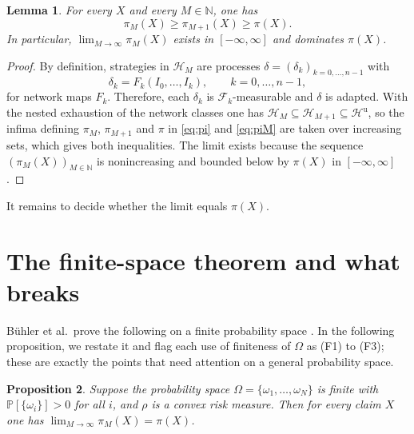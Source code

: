 \documentclass[11pt,a4paper]{report}
\numberwithin{equation}{chapter}
\theoremstyle{plain}
\newtheorem{proposition}{Proposition}[chapter]
\newtheorem{lemma}[proposition]{Lemma}
\theoremstyle{definition}
\newcommand{\PP}{\mathbb{P}}
\newcommand{\N}{\mathbb{N}}
\newcommand{\F}{\mathcal{F}}
\newcommand{\HH}{\mathcal{H}}
\newcommand{\Hu}{\mathcal{H}^{\mathrm{u}}}
\begin{document}
\begin{lemma}\label{lem:monotone}
  For every $X$ and every $M\in\N$, one has
  \[
    \pi_M(X)\ge\pi_{M+1}(X)\ge\pi(X).
  \]
  In particular, $\lim_{M\to\infty}\pi_M(X)$ exists in
  $[-\infty,\infty]$ and dominates $\pi(X)$.
\end{lemma}

\begin{proof}
  By definition, strategies in $\HH_M$ are processes
  $\delta=(\delta_k)_{k=0,\dots,n-1}$ with
  \[
    \delta_k=F_k(I_0,\dots,I_k),\qquad k=0,\dots,n-1,
  \]
  for network maps $F_k$.  Therefore, each $\delta_k$ is $\F_k$-measurable
  and $\delta$ is adapted. With the nested exhaustion of the network
  classes one has $\HH_M\subseteq\HH_{M+1}\subseteq\Hu$, so the infima
  defining $\pi_M$, $\pi_{M+1}$ and $\pi$ in \eqref{eq:pi} and
  \eqref{eq:piM} are taken over increasing sets, which gives both
  inequalities. The limit exists because the sequence
  $(\pi_M(X))_{M\in\N}$ is nonincreasing and bounded below by $\pi(X)$
  in $[-\infty,\infty]$.
\end{proof}

It remains to decide whether the limit equals $\pi(X)$.

\section{The finite-space theorem and what breaks}
\label{sec:finite}

\noindent
B\"uhler et al.\ prove the following on a finite probability space \cite[Proposition~4.3]{buehler}. In
the following proposition, we restate it and flag each use of finiteness of $\Omega$ as (F1) to (F3);
these are exactly the points that need attention on a general
probability space.
\begin{proposition}\label{prop:finitespace}
  Suppose the probability space $\Omega=\{\omega_1,\dots,\omega_N\}$ is
  finite with $\PP[\{\omega_i\}]>0$ for all $i$, and $\rho$ is a
  convex risk measure. Then for every claim $X$ one has
  $\displaystyle\lim_{M\to\infty}\pi_M(X)=\pi(X)$.
\end{proposition}
\end{document}
